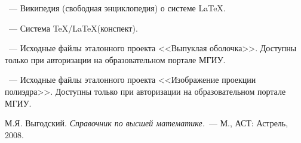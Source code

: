 \begin{thebibliography}{}

~---
Википедия (свободная энциклопедия) о системе \LaTeX.

~---
Система \TeX/\LaTeX (конспект).

~---
Исходные файлы эталонного проекта <<Выпуклая оболочка>>.
Доступны только при авторизации на образовательном портале МГИУ.

~---
Исходные файлы эталонного проекта <<Изображение проекции полиэдра>>.
Доступны только при авторизации на образовательном портале МГИУ.

М.Я. Выгодский.
{\em Справочник по высшей математике.}~---
М., АСТ: Астрель, 2008.

\end{thebibliography}

\endinput


